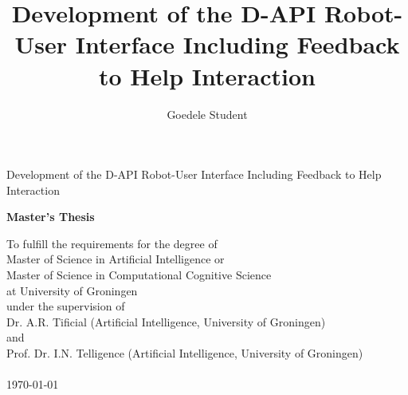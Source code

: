 \title{
    \vspace{5cm}
    Development of the D-API Robot-User Interface Including Feedback to Help Interaction
    }
\date{}
\author{Goedele Student}

\maketitle
\thispagestyle{titlepage}
\setlength{\headheight}{52pt}

\newpage

\thispagestyle{titlepage}

\vspace*{4cm}

\begin{center}
    {{\Huge  Development of the D-API Robot-User Interface Including Feedback to Help Interaction}}\\
    
    \vspace{2cm}
    
    {\bf Master's Thesis}\\
    
    \vspace{0.5cm}
    
    To fulfill the requirements for the degree of\\Master of Science in Artificial Intelligence or \\Master of Science in Computational Cognitive Science\\
    at University of Groningen \\
    under the supervision of\\
    Dr. A.R. Tificial (Artificial Intelligence, University of Groningen)\\
    and\\
     Prof. Dr. I.N. Telligence (Artificial Intelligence, University of Groningen)\\
     
    \vspace{3cm}{\bf Goedele Student (s1234567)}\\
    \vspace{4cm}\today
    
\end{center}

\newpage

\setlength{\headheight}{32pt}
